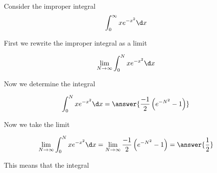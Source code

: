 \documentclass{ximera}
\author{Jason Miller}
\begin{document}
\begin{exercise}
Consider the improper integral 
\[
\int_{0}^{\infty} xe^{-x^{2}} \d x 
\]


First we rewrite the improper integral as a limit

\[
\lim_{N \to \infty} \int_{0}^{N} xe^{-x^{2}} \d x
\]

Now we determine the integral 

\[
\int_{0}^{N} xe^{-x^{2}} \d x= \answer{ \frac{-1}{2}\left(e^{-N^{2}}-1 \right) }
\]

\begin{exercise}
Now we take the limit 

\[
\lim_{N \to \infty} \int_{0}^{N} xe^{-x^{2}} \d x=\lim_{N \to \infty} \frac{-1}{2} \left( e^{-N^{2}}-1 \right) = 
\answer{ \frac{1}{2}} 
\]

\begin{exercise}
This means that the integral 

\begin{multipleChoice}
\end{multipleChoice}

\end{exercise}
\end{exercise}
\end{exercise}
\end{document}
